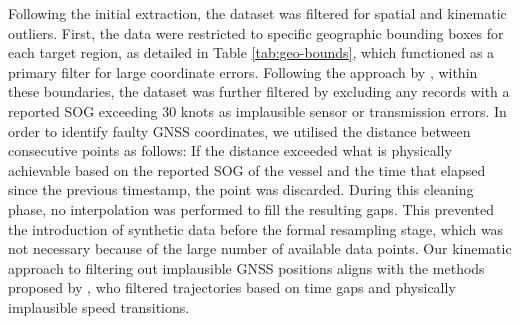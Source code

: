 Following the initial extraction, the dataset was filtered for spatial and kinematic outliers. 
First, the data were restricted to specific geographic bounding boxes for each target region, as detailed in Table \ref{tab:geo-bounds}, which functioned as a primary filter for large coordinate errors. 
Following the approach by \textcite{articlebilstmsus}, within these boundaries, the dataset was further filtered by excluding any records with a reported \ac{SOG} exceeding 30 knots as implausible sensor or transmission errors.
In order to identify faulty \ac{GNSS} coordinates, we utilised the distance between consecutive points as follows: 
If the distance exceeded what is physically achievable based on the reported \ac{SOG} of the vessel and the time that elapsed since the previous timestamp, the point was discarded.
During this cleaning phase, no interpolation was performed to fill the resulting gaps.
This prevented the introduction of synthetic data before the formal resampling stage, which was not necessary because of the large number 
of available data points.
Our kinematic approach to filtering out implausible \ac{GNSS} positions %
aligns with the methods proposed by \textcite{Zhao_Shi_Yang_2018}, who filtered trajectories based on time gaps and physically implausible speed transitions.

